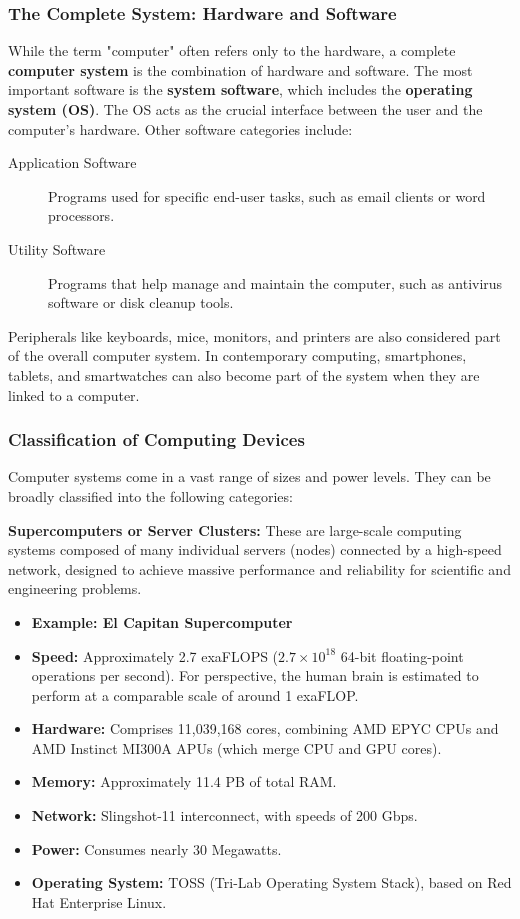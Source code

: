 \subsubsection{The Complete System: Hardware and Software}
While the term "computer" often refers only to the hardware, a complete \textbf{computer system} is the combination of hardware and software. The most important software is the \textbf{system software}, which includes the \textbf{operating system (OS)}. The OS acts as the crucial interface between the user and the computer's hardware. Other software categories include:
\begin{description}
    \item[Application Software] Programs used for specific end-user tasks, such as email clients or word processors.
    \item[Utility Software] Programs that help manage and maintain the computer, such as antivirus software or disk cleanup tools.
\end{description}
Peripherals like keyboards, mice, monitors, and printers are also considered part of the overall computer system. In contemporary computing, smartphones, tablets, and smartwatches can also become part of the system when they are linked to a computer.

\subsubsection{Classification of Computing Devices}
Computer systems come in a vast range of sizes and power levels. They can be broadly classified into the following categories:

    \textbf{Supercomputers or Server Clusters:} These are large-scale computing systems composed of many individual servers (nodes) connected by a high-speed network, designed to achieve massive performance and reliability for scientific and engineering problems.
    \begin{itemize}
        \item \textbf{Example: El Capitan Supercomputer}
        \item \textbf{Speed:} Approximately 2.7 exaFLOPS ($2.7 \times 10^{18}$ 64-bit floating-point operations per second). For perspective, the human brain is estimated to perform at a comparable scale of around 1 exaFLOP.
        \item \textbf{Hardware:} Comprises 11,039,168 cores, combining AMD EPYC CPUs and AMD Instinct MI300A APUs (which merge CPU and GPU cores).
        \item \textbf{Memory:} Approximately 11.4 PB of total RAM.
        \item \textbf{Network:} Slingshot-11 interconnect, with speeds of 200 Gbps.
        \item \textbf{Power:} Consumes nearly 30 Megawatts.
        \item \textbf{Operating System:} TOSS (Tri-Lab Operating System Stack), based on Red Hat Enterprise Linux.
    \end{itemize}

